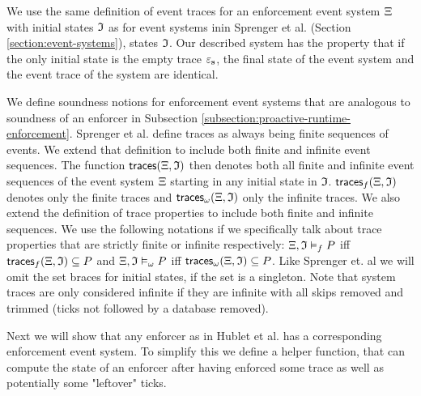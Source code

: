 We use the same definition of event traces for an enforcement event system 
$\Xi$ with initial states $\mathfrak{I}$ as for
event systems inin Sprenger et al. \cite{igloo} (Section \ref{section:event-systems}),
states $\mathfrak{I}$.
Our described system has the property that if the only initial state is
the empty trace $\varepsilon_{\mathbf{s}}$, the final state of the event system
and the event trace of the system are identical.

We define soundness notions for enforcement event systems that are analogous to
soundness of an enforcer in Subsection
\ref{subsection:proactive-runtime-enforcement}.
Sprenger et al. \cite{igloo} define traces as always being finite sequences of
events. We extend that definition to include both finite and infinite
event sequences.
The function $\mathsf{traces}(\Xi, \mathfrak{I})$ then denotes both all
finite and infinite event sequences of the event system $\Xi$
starting in any initial state in $\mathfrak{I}$.
$\mathsf{traces}_f(\Xi, \mathfrak{I})$ denotes only the finite traces
and $\mathsf{traces}_\omega(\Xi, \mathfrak{I})$ only the
infinite traces.
We also extend the definition of trace properties to include both
finite and infinite sequences.
We use the following notations if we specifically talk
about trace properties that are strictly finite or infinite respectively:
$\Xi, \mathfrak{I} \vDash_f P$ iff
$\mathsf{traces}_f(\Xi, \mathfrak{I}) \subseteq P$
and
$\Xi, \mathfrak{I} \vDash_\omega P$ iff
$\mathsf{traces}_\omega(\Xi, \mathfrak{I}) \subseteq P$.
Like Sprenger et. al \cite{igloo} we will omit the set braces
for initial states, if the set is a singleton.
Note that system traces are only considered infinite if they
are infinite with all skips removed and trimmed (ticks not followed
by a database removed).

Next we will show that any enforcer as in Hublet et al. \cite{whyenf} has a
corresponding enforcement event system.
To simplify this we define a helper function, that can compute the
state of an enforcer after having enforced some trace as well as potentially
some "leftover" ticks.

